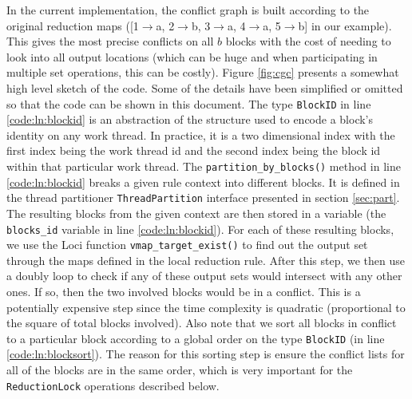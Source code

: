 \documentclass{article}
\begin{document}
In the current implementation, the conflict graph is built according to
the original reduction maps ([1$\to$a, 2$\to$b, 3$\to$a, 4$\to$a,
5$\to$b] in our example).  This gives the most precise conflicts on all
$b$ blocks with the cost of needing to look into all output locations
(which can be huge and when participating in multiple set operations,
this can be costly).  Figure \ref{fig:cgc} presents a somewhat high
level sketch of the code.  Some of the details have been simplified or
omitted so that the code can be shown in this document.  The type
\lstinline{BlockID} in line \ref{code:ln:blockid} is an abstraction of
the structure used to encode a block's identity on any work thread.  In
practice, it is a two dimensional index with the first index being the
work thread id and the second index being the block id within that
particular work thread.  The \lstinline{partition_by_blocks()} method in
line \ref{code:ln:blockid} breaks a given rule context into different
blocks.  It is defined in the thread partitioner
\lstinline{ThreadPartition} interface presented in section
\ref{sec:part}.  The resulting blocks from the given context are then
stored in a variable (the \lstinline{blocks_id} variable in line
\ref{code:ln:blockid}).  For each of these resulting blocks, we use the
Loci function \lstinline{vmap_target_exist()} to find out the output set
through the maps defined in the local reduction rule.  After this step,
we then use a doubly loop to check if any of these output sets would
intersect with any other ones.  If so, then the two involved blocks
would be in a conflict.  This is a potentially expensive step since the
time complexity is quadratic (proportional to the square of total blocks
involved).  Also note that we sort all blocks in conflict to a
particular block according to a global order on the type
\lstinline{BlockID} (in line \ref{code:ln:blocksort}).  The reason for
this sorting step is ensure the conflict lists for all of the blocks are
in the same order, which is very important for the
\lstinline{ReductionLock} operations described below.
\end{document}
